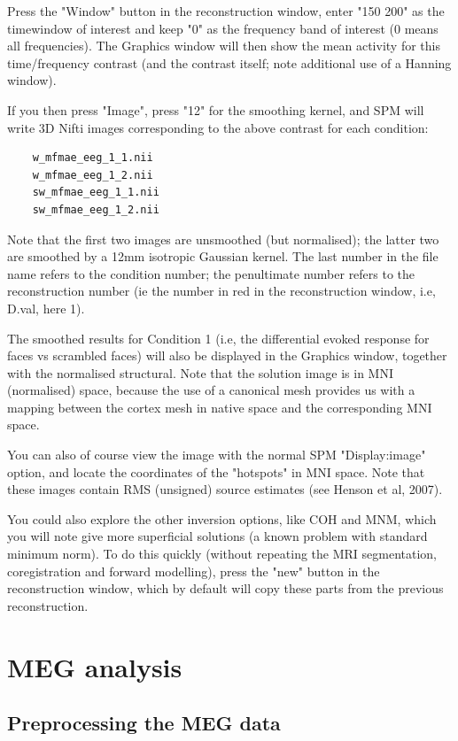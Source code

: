 \noindent * Press the "Window" button in the reconstruction window, enter "150 200" as the timewindow of interest and keep "0" as the frequency band of interest (0 means all frequencies). The Graphics window will then show the mean activity for this time/frequency contrast (and the contrast itself; note additional use of a Hanning window).

\noindent * If you then press "Image", press "12" for the smoothing kernel, and SPM will write 3D Nifti images corresponding to the above contrast for each condition:
\begin{verbatim}
	w_mfmae_eeg_1_1.nii
	w_mfmae_eeg_1_2.nii
	sw_mfmae_eeg_1_1.nii
	sw_mfmae_eeg_1_2.nii
\end{verbatim}
Note that the first two images are unsmoothed (but normalised); the latter two are smoothed by a 12mm isotropic Gaussian kernel. The last number in the file name refers to the condition number; the penultimate number refers to the reconstruction number (ie the number in red in the reconstruction window, i.e, D.val, here 1).

The smoothed results for Condition 1 (i.e, the differential evoked response for faces vs scrambled faces) will also be displayed in the Graphics window, together with the normalised structural. Note that the solution image is in MNI (normalised) space, because the use of a canonical mesh provides us with a mapping between the cortex mesh in native space and the corresponding MNI space.

You can also of course view the image with the normal SPM "Display:image" option, and locate the coordinates of the "hotspots" in MNI space. Note that these images contain RMS (unsigned) source estimates (see Henson et al, 2007).

You could also explore the other inversion options, like COH and MNM, which you will note give more superficial solutions (a known problem with standard minimum norm). To do this quickly (without repeating the MRI segmentation, coregistration and forward modelling), press the "new" button in the reconstruction window, which by default will copy these parts from the previous reconstruction.


\section{MEG analysis}

\subsection{Preprocessing the MEG data}


